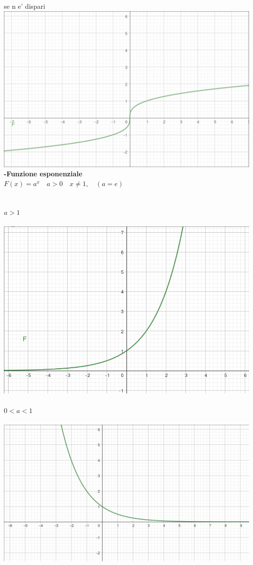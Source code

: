 \documentclass{article}
\begin{document}
\\
\\
se n e' dispari\\
\includegraphics{./immagini/funzione-radice-dispari.png}
\\
\textbf{-Funzione esponenziale}\\
$F(x)=a^{x} \quad a > 0 \quad x \ne 1, \quad (a = e)$\\
\\
\\
$a>1$
\\
\\
\includegraphics{./immagini/funzione-esponenziale.png}
\\
\\
$0<a<1$
\\
\\
\includegraphics{./immagini/funzione-esponenziale-negativa.png}
\end{document}

